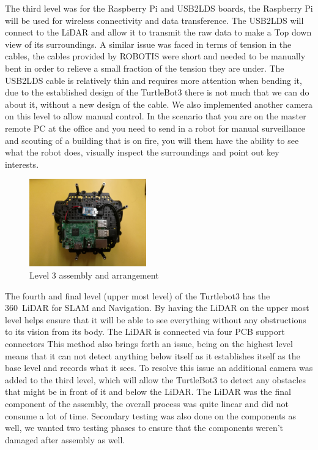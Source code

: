 \documentclass[12pt]{report}
\begin{document}
The third level was for the Raspberry Pi and USB2LDS boards, the Raspberry Pi will be used for wireless connectivity and data transference. The USB2LDS will connect to the LiDAR and allow it to transmit the raw data to make a Top down view of its surroundings. A similar issue was faced in terms of tension in the cables, the cables provided by ROBOTIS were short and needed to be manually bent in order to relieve a small fraction of the tension they are under. The USB2LDS cable is relatively thin and requires more attention when bending it, due to the established design of the TurtleBot3 there is not much that we can do about it, without a new design of the cable. We also implemented another camera on this level to allow manual control. In the scenario that you are on the master remote PC at the office and you need to send in a robot for manual surveillance and scouting of a building that is on fire, you will them have the ability to see what the robot does, visually inspect the surroundings and point out key interests.\par
\begin{figure}[H]
        \centering
        \includegraphics[width=0.45\textwidth]{Fig5.png}
        \caption{Level 3 assembly and arrangement}
        \label{fig:5}
    \end{figure}
\vspace{1em}
The fourth and final level (upper most level) of the Turtlebot3 has the 360\degree\  LiDAR for SLAM and Navigation. By having the LiDAR on the upper most level helps ensure that it will be able to see everything without any obstructions to its vision from its body. The LiDAR is connected via four PCB support connectors This method also brings forth an issue, being on the highest level means that it can not detect anything below itself as it establishes itself as the base level and records what it sees. To resolve this issue an additional camera was added to the third level, which will allow the TurtleBot3 to detect any obstacles that might be in front of it and below the LiDAR. The LiDAR was the final component of the assembly, the overall process was quite linear and did not consume a lot of time. Secondary testing was also done on the components as well, we wanted two testing phases to ensure that the components weren’t damaged after assembly as well.\par
\end{document}
